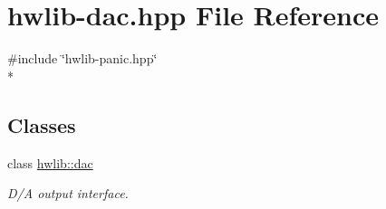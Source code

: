 \hypertarget{hwlib-dac_8hpp}{}\section{hwlib-\/dac.hpp File Reference}
\label{hwlib-dac_8hpp}
{\ttfamily \#include \char`\"{}hwlib-\/panic.\+hpp\char`\"{}}\\*
\subsection*{Classes}
\begin{DoxyCompactItemize}
\item 
class \hyperlink{classhwlib_1_1dac}{hwlib\+::dac}
\begin{DoxyCompactList}\small\item\em D/A output interface. \end{DoxyCompactList}\end{DoxyCompactItemize}
